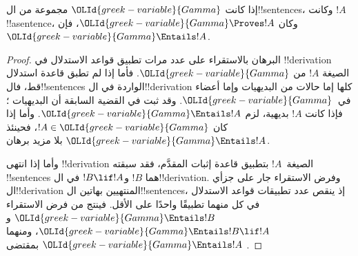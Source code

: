 \documentclass[../../../include/open-logic-section]{subfiles}
\begin{document}
\begin{thm}[السلامة]
إذا كانت ${\OLId{greek-variable}{Gamma}}$ مجموعة من ال!!{sentence}s، وكانت $!A$ !!a{sentence}،
وكان ${\OLId{greek-variable}{Gamma}} \Proves !A$، فإن ${\OLId{greek-variable}{Gamma}} \Entails !A$.
\end{thm}

\begin{proof}
البرهان بالاستقراء على عدد مرات تطبيق قواعد الاستدلال في !!{derivation}
الصيغة $!A$ من ${\OLId{greek-variable}{Gamma}}$. فأما إذا لم تطبق قاعدة استدلال قط، فال!!{sentence}s
الواردة في ال!!{derivation} كلها إما حالات من البديهيات وإما أعضاء
في~${\OLId{greek-variable}{Gamma}}$. وقد ثبت في القضية السابقة أن البديهيات
؛ فإذا كانت $!A$ بديهية، لزم
${\OLId{greek-variable}{Gamma}} \Entails !A$. وأما إذا كان $!A \in {\OLId{greek-variable}{Gamma}}$، فحينئذ
${\OLId{greek-variable}{Gamma}} \Entails !A$ بلا مزيد برهان.

وأما إذا انتهى !!{derivation} الصيغة~$!A$ بتطبيق قاعدة إثبات المقدَّم،
فقد سبقته !!{sentence}s هما $!B$ و$!B \lif !A$ في
ال!!{derivation}. وفرض الاستقراء جار على جزأي ال!!{derivation}
المنتهيين بهاتين ال!!{sentence}s، إذ ينقص عدد تطبيقات قواعد الاستدلال
في كل منهما تطبيقًا واحدًا على الأقل. فينتج من فرض الاستقراء
${\OLId{greek-variable}{Gamma}} \Entails !B$ و${\OLId{greek-variable}{Gamma}} \Entails !B \lif !A$، ومنهما
${\OLId{greek-variable}{Gamma}} \Entails !A$ بمقتضى
      {}
      {}.

\end{proof}
\end{document}
